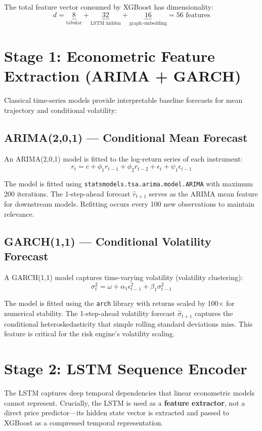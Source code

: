 \documentclass[letterpaper,11pt]{report}
\begin{document}
The total feature vector consumed by XGBoost has dimensionality:
$$d = \underbrace{8}_{\text{tabular}} + \underbrace{32}_{\text{LSTM hidden}} + \underbrace{16}_{\text{graph embedding}} = 56 \text{ features}$$

\section{Stage 1: Econometric Feature Extraction (ARIMA + GARCH)}

Classical time-series models provide interpretable baseline forecasts for mean trajectory and conditional volatility:

\subsection{ARIMA(2,0,1) — Conditional Mean Forecast}

An ARIMA(2,0,1) model is fitted to the log-return series of each instrument:
$$r_t = c + \phi_1 r_{t-1} + \phi_2 r_{t-2} + \epsilon_t + \psi_1 \epsilon_{t-1}$$

The model is fitted using \texttt{statsmodels.tsa.arima.model.ARIMA} with maximum 200 iterations. The 1-step-ahead forecast $\hat{r}_{t+1}$ serves as the ARIMA mean feature for downstream models. Refitting occurs every 100 new observations to maintain relevance.

\subsection{GARCH(1,1) — Conditional Volatility Forecast}

A GARCH(1,1) model captures time-varying volatility (volatility clustering):
$$\sigma_t^2 = \omega + \alpha_1 \epsilon_{t-1}^2 + \beta_1 \sigma_{t-1}^2$$

The model is fitted using the \texttt{arch} library with returns scaled by 100$\times$ for numerical stability. The 1-step-ahead volatility forecast $\hat{\sigma}_{t+1}$ captures the conditional heteroskedasticity that simple rolling standard deviations miss. This feature is critical for the risk engine's volatility scaling.

\section{Stage 2: LSTM Sequence Encoder}

The LSTM captures deep temporal dependencies that linear econometric models cannot represent. Crucially, the LSTM is used as a \textbf{feature extractor}, not a direct price predictor---its hidden state vector is extracted and passed to XGBoost as a compressed temporal representation.
\end{document}
